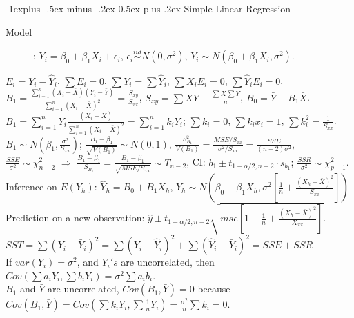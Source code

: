 \documentclass[10pt,landscape]{article}
\makeatletter
\renewcommand{\subsection}{\@startsection{subsection}{2}{0mm}%
                                {-1explus -.5ex minus -.2ex}%
                                {0.5ex plus .2ex}%
                                {\normalfont\normalsize\bfseries}}
\makeatother
\begin{document}
\begin{multicols}{3}
\subsection{Simple Linear Regression}
    \begin{description}
        \item[Model]: $Y_i = \beta_0 + \beta_1X_i + \epsilon_i$, $\epsilon_i \overset{iid}{\sim} N(0, \sigma^2)$, $Y_i\sim	N(\beta_0 + \beta_1X_i, \sigma^2)$. 
    \end{description}
    $E_i = Y_i - \hat{Y}_i$, $\sum E_i = 0$, $\sum Y_i = \sum \hat{Y}_i$, $\sum X_iE_i = 0$, $\sum \hat{Y}_iE_i = 0$. \\
    $B_1 = \frac{\sum_{i=1}^n (X_i-\bar{X})(Y_i-\bar{Y})}{\sum_{i=1}^n (X_i-\bar{X})^2} = \frac{S_{xy}}{S_{xx}}$, $S_{xy} = \sum XY - \frac{\sum X \sum Y}{n}$, $B_0 = \bar{Y} - B_1\bar{X}$. \\
    $B_1 = \sum_{i=1}^n Y_i \frac{(X_i-\bar{X})}{\sum_{i=1}^n (X_i-\bar{X})^2} =\sum_{i=1}^n k_i Y_i $; $\sum	k_i=0$, $\sum k_ix_i=1$, $\sum	 k_i^2 = \frac{1}{S_{xx}}$. \\
    $B_1 \sim	N(\beta_1, \frac{\sigma^2}{S_{xx}})$; $\frac{B_1 - \beta_1}{\sqrt{V(B_1)}}\sim N(0,1)$, $\frac{S_{B_1}^2}{V(B_1)} = \frac{MSE/S_{xx}}{\sigma^2/S_{xx}} = \frac{SSE}{(n-2)\sigma^2}$, \\
    $\frac{SSE}{\sigma^2}\sim	\chi_{n-2}^2$ $\Rightarrow$ $\frac{B_1 - \beta_1}{S_{B_1}} = \frac{B_1 - \beta_1}{\sqrt{MSE/S_{xx}}} \sim T_{n-2}$, CI: $b_1 \pm t_{1-\alpha/2, n-2} \cdot s_{b_1}$; $\frac{SSR}{\sigma^2} \sim	\chi_{p-1}^2$. \\
    Inference on $E(Y_h)$: $\hat{Y}_h = B_0 + B_1X_h $, $\hat{Y}_h \sim N(\beta_0 + \beta_1 X_h, \sigma^2[\frac{1}{n} + \frac{(X_h - \bar{X})^2}{S_{xx}}])$ \\
    Prediction on a new observation: $\hat{y} \pm t_{1-\alpha/2, n-2}\sqrt{mse[1+\frac{1}{n}+\frac{(X_h - \bar{X})^2}{X_{xx}}]}$. \\
    $SST = \sum	(Y_i - \bar{Y}_i)^2 = \sum	(Y_i - \hat{Y}_i)^2 + \sum	(\hat{Y}_i - \bar{Y}_i)^2 = SSE + SSR$\\
    If $var(Y_i) = \sigma^2$, and $Y_i's$ are uncorrelated, then $Cov(\sum	a_iY_i, \sum	b_iY_i) = \sigma^2\sum a_ib_i$. \\
    $B_1$ and $\bar{Y}$ are uncorrelated, $Cov(B_1, \bar{Y}) = 0$ because $Cov(B_1, \bar{Y}) = Cov(\sum k_i Y_i, \sum \frac{1}{n}Y_i) = \frac{\sigma^2}{n} \sum	k_i = 0$. \\
     

\end{multicols}
\end{document}
